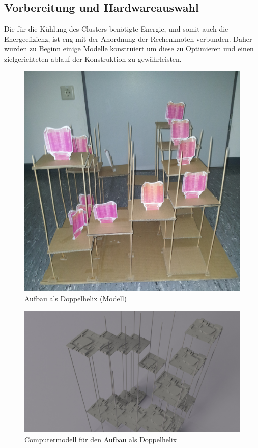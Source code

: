 \subsection{Vorbereitung und Hardwareauswahl}
Die für die Kühlung des Clusters benötigte Energie, und
somit auch die Energeefizienz, ist eng mit der Anordnung der Rechenknoten
verbunden. Daher wurden zu Beginn einige Modelle konstruiert 
um diese zu Optimieren und einen zielgerichteten ablauf der Konstruktion
zu gewährleisten.~\\
\begin{minipage}{0.45\textwidth}
\begin{figure}[H]
  \centering
    \includegraphics[scale=0.07]{./Bilder/20150929_133702-2.jpg}
\caption{Aufbau als Doppelhelix (Modell)}
    \label{fig:HWP_DoppelHelixModell}
\end{figure} 
\end{minipage}
\hfill
\begin{minipage}{0.45\textwidth}
 \begin{figure}[H]
  \centering
    \includegraphics[width=\textwidth]{./Bilder/render3.jpg}
\caption{Computermodell für den Aufbau als Doppelhelix}
    \label{fig:HWP_DoppelHelixModellBlender}
\end{figure}
\end{minipage}


